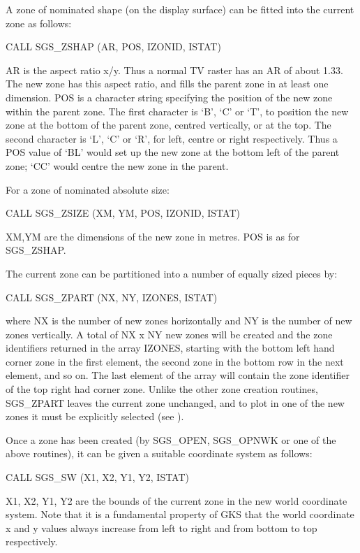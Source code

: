 \documentclass[11pt]{starlink}
\begin{document}
A zone of nominated shape (on the
display surface) can be fitted into the current zone as
follows:
\begin{terminalv}
CALL SGS_ZSHAP (AR, POS, IZONID, ISTAT)
\end{terminalv}
AR is the aspect ratio x/y.  Thus a normal TV raster has an
AR of about 1.33.  The new zone has this aspect ratio,
and fills the parent zone in at least one dimension.  POS
is a character string specifying the position of the new zone
within the parent zone.  The first character is `B', `C'
or `T', to position the new zone at the bottom of the
parent zone, centred vertically, or at the top.  The second character
is `L', `C' or
`R', for left, centre or right respectively.  Thus a POS value
of `BL' would set up the new zone at the bottom left of
the parent zone;  `CC' would centre the new zone in the parent.

For a zone of nominated absolute size:
\begin{terminalv}
CALL SGS_ZSIZE (XM, YM, POS, IZONID, ISTAT)
\end{terminalv}
XM,YM are the dimensions of the new zone in metres.  POS is as for
SGS\_ZSHAP.

The current zone can be partitioned into a number of equally sized pieces
by:
\begin{terminalv}
CALL SGS_ZPART (NX, NY, IZONES, ISTAT)
\end{terminalv}
where NX is the number of new zones horizontally and NY is the number of new
zones vertically.  A total of NX x NY new zones will be created and the zone
identifiers
returned in the array IZONES, starting with the bottom left hand corner zone in
the first element, the second zone in the bottom row in the next element, and
so on.  The last element of the array will contain the zone
identifier of the top right
had corner zone.  Unlike the other zone creation routines, SGS\_ZPART leaves the
current zone unchanged, and to plot in one of the new zones it must be
explicitly selected (see ).

Once a zone has been created (by SGS\_OPEN, SGS\_OPNWK or one of the
above routines), it can be given a suitable coordinate
system as follows:
\begin{terminalv}
CALL SGS_SW (X1, X2, Y1, Y2, ISTAT)
\end{terminalv}
X1, X2, Y1, Y2 are the bounds of the current zone in the new
world coordinate system.  Note that it is a fundamental property of GKS that
the world coordinate x and y values always increase from left to right and
from bottom to top respectively.
\end{document}
